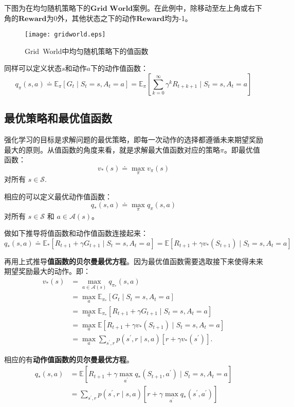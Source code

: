 下图为在均匀随机策略下的$\textbf{Grid\ World}$案例。在此例中，除移动至左上角或右下角的$\textbf{Reward}$为0外，其他状态之下的动作$\textbf{Reward}$均为-1。
\begin{figure}[hbt]
    \centering
    \texttt{[image: gridworld.eps]}
	\vspace{-0.5cm}
    \caption{Grid\ World中均匀随机策略下的值函数}
    \label{GridWorld_solution}
\end{figure}

同样可以定义状态$s$和动作$a$下的动作值函数：
$$
q_{\pi}(s, a) \doteq \mathbb{E}_{\pi}\left[G_{t} \mid S_{t}=s, A_{t}=a\right]=\mathbb{E}_{\pi}\left[\sum_{k=0}^{\infty} \gamma^{k} R_{t+k+1} \mid S_{t}=s, A_{t}=a\right]
$$
\subsection{最优策略和最优值函数}
强化学习的目标是求解问题的最优策略，即每一次动作的选择都遵循未来期望奖励最大的原则。从值函数的角度来看，就是求解最大值函数对应的策略$\pi$。即最优值函数：
$$
v_{*}(s) \doteq \max _{\pi} v_{\pi}(s)
$$
对所有 $s \in \mathcal{S}$.

相应的可以定义最优动作值函数：
$$
q_{*}(s, a) \doteq \max _{\pi} q_{\pi}(s, a)
$$
对所有 $s \in \mathcal{S}$ 和 $a \in \mathcal{A}(s)$。

做如下推导将值函数和动作值函数连接起来：
$$
q_{*}(s, a)\doteq \mathbb{E}_{*}\left[R_{t+1}+\gamma G_{t+1} \mid S_{t}=s, A_{t}=a\right]=\mathbb{E}\left[R_{t+1}+\gamma v_{*}\left(S_{t+1}\right) \mid S_{t}=s, A_{t}=a\right]
$$

再用上式推导\textbf{值函数的贝尔曼最优方程}。因为最优值函数需要选取接下来使得未来期望奖励最大的动作。即：
$$
\begin{aligned}
v_{*}(s) &=\max _{a \in \mathcal{A}(s)} q_{\pi_{*}}(s, a) \\
&=\max _{a} \mathbb{E}_{\pi_{*}}\left[G_{t} \mid S_{t}=s, A_{t}=a\right] \\
&=\max _{a} \mathbb{E}_{\pi_{*}}\left[R_{t+1}+\gamma G_{t+1} \mid S_{t}=s, A_{t}=a\right] \\
&=\max _{a} \mathbb{E}\left[R_{t+1}+\gamma v_{*}\left(S_{t+1}\right) \mid S_{t}=s, A_{t}=a\right] \\
&=\max _{a} \sum_{s^{\prime}, r} p\left(s^{\prime}, r \mid s, a\right)\left[r+\gamma v_{*}\left(s^{\prime}\right)\right] .
\end{aligned}
$$

相应的有\textbf{动作值函数的贝尔曼最优方程}。
$$
\begin{aligned}
q_{*}(s, a) &=\mathbb{E}\left[R_{t+1}+\gamma \max _{a^{\prime}} q_{*}\left(S_{t+1}, a^{\prime}\right) \mid S_{t}=s, A_{t}=a\right] \\
&=\sum_{s^{\prime}, r} p\left(s^{\prime}, r \mid s, a\right)\left[r+\gamma \max _{a^{\prime}} q_{*}\left(s^{\prime}, a^{\prime}\right)\right]
\end{aligned}
$$
